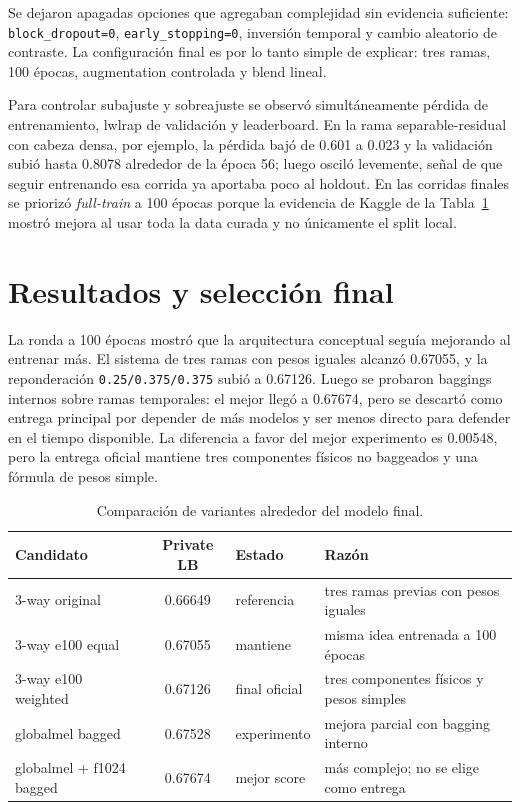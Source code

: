 \documentclass[10pt]{article}
\begin{document}
Se dejaron apagadas opciones que agregaban complejidad sin evidencia suficiente:
\texttt{block\_dropout=0}, \texttt{early\_stopping=0}, inversión temporal y
cambio aleatorio de contraste. La configuración final es por lo tanto simple de
explicar: tres ramas, 100 épocas, augmentation controlada y blend lineal.

Para controlar subajuste y sobreajuste se observó simultáneamente pérdida de
entrenamiento, lwlrap de validación y leaderboard. En la rama separable-residual
con cabeza densa, por ejemplo, la pérdida bajó de 0.601 a 0.023 y la validación
subió hasta 0.8078 alrededor de la época 56; luego osciló levemente, señal de
que seguir entrenando esa corrida ya aportaba poco al holdout. En las corridas
finales se priorizó \textit{full-train} a 100 épocas porque la evidencia de
Kaggle de la Tabla~\ref{tab:finalexp} mostró mejora al usar toda la data curada
y no únicamente el split local.

\section{Resultados y selección final}
La ronda a 100 épocas mostró que la arquitectura conceptual seguía mejorando al
entrenar más. El sistema de tres ramas con pesos iguales alcanzó 0.67055, y la
reponderación \texttt{0.25/0.375/0.375} subió a 0.67126. Luego se probaron
baggings internos sobre ramas temporales: el mejor llegó a 0.67674, pero se
descartó como entrega principal por depender de más modelos y ser menos directo
para defender en el tiempo disponible. La diferencia a favor del mejor
experimento es 0.00548, pero la entrega oficial mantiene tres componentes
físicos no baggeados y una fórmula de pesos simple.

\begin{table}[H]
\centering
\small
\begin{tabularx}{\textwidth}{@{}lclX@{}}
\toprule
Candidato & Private LB & Estado & Razón \\
\midrule
3-way original & 0.66649 & referencia & tres ramas previas con pesos iguales \\
3-way e100 equal & 0.67055 & mantiene & misma idea entrenada a 100 épocas \\
3-way e100 weighted & 0.67126 & final oficial & tres componentes físicos y pesos simples \\
globalmel bagged & 0.67528 & experimento & mejora parcial con bagging interno \\
globalmel + f1024 bagged & 0.67674 & mejor score & más complejo; no se elige como entrega \\
\bottomrule
\end{tabularx}
\caption{Comparación de variantes alrededor del modelo final.}
\label{tab:finalexp}
\end{table}
\end{document}
